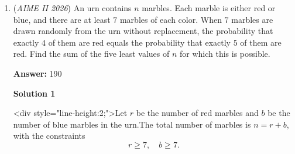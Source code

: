 \begin{enumerate}
 
 \[\sum_{i=0}^{k} d_i (M+1)^i = \sum_{i=0}^{k} d_i (10)^i\]

 Case 1: $M < 9$

 If the maximum digit $M$ is less than $9$, then the base $b = M+1$ satisfies $b \le 9$.

 For single-digit numbers ($k=0$), the equation simplifies to $d_0 = d_0$, which is an identity. Thus, $n \in \{1, 2, \dots, 8\}$ all work (8 values).

 For multi-digit numbers ($k \ge 1$), since $M+1 < 10$, it follows that $(M+1)^i < 10^i$ for all $i \ge 1$. Because $d_i \ge 0$ and at least one $d_i > 0$ for $i \ge 1$, the Left Hand Side (LHS) is strictly less than the Right Hand Side (RHS). Therefore, no multi-digit numbers work in this case.

 Case 2: $M = 9$

 If the maximum digit is $9$, then the base is $b = 9+1 = 10$.

 The equation becomes:

 
 \[\sum_{i=0}^{k} d_i (10)^i = \sum_{i=0}^{k} d_i (10)^i\]

 This is an identity. Thus, any number $n < 1000$ that contains at least one digit $9$ will satisfy $f(n) = n$.

 Using complementary counting: Integers with no digit $9$: Each of the three decimal places (treating $1$ as $001$, etc.) can be any of the $9$ digits $\{0, 1, \dots, 8\}$. This gives $9 \times 9 \times 9 = 729$ such numbers.

 Total for Case 2: $1000 - 729 = 271$.

 Adding the two cases together, we get $8 + 271 = \boxed{279}$.

 


	\item (\textit{AIME II 2026}) An urn contains $n$ marbles. Each marble is either red or blue, and there are at least $7$ marbles of each color. When $7$ marbles are drawn randomly from the urn without replacement, the probability that exactly $4$ of them are red equals the probability that exactly $5$ of them are red. Find the sum of the five least values of $n$ for which this is possible.


 
 \textbf{Answer: }190



\textbf{Solution 1}

<div style="line-height:2;">Let $r$ be the number of red marbles and $b$ be the number of blue marbles in the urn.The total number of marbles is $n = r + b$, with the constraints
 \[r \geq 7,\quad b \geq 7.\]


\end{enumerate}
